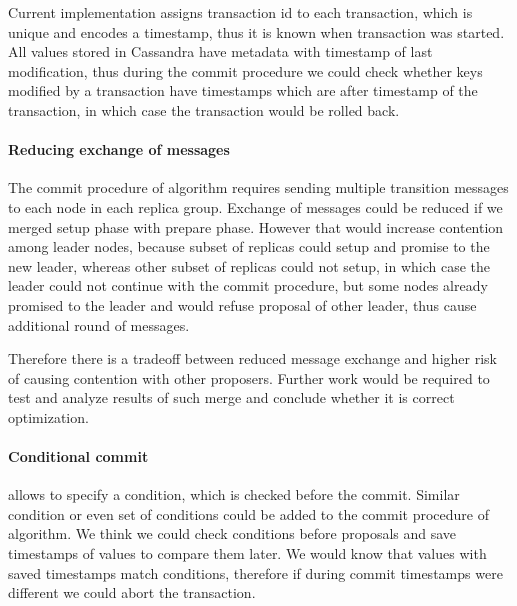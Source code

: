 Current implementation assigns transaction id to each transaction, which is unique and encodes a timestamp, thus it is known when transaction was started. All values stored in Cassandra have metadata with timestamp of last modification, thus during the commit procedure we could check whether keys modified by a transaction have timestamps which are after timestamp of the transaction, in which case the transaction would be rolled back.

\paragraph{Reducing exchange of messages}
The commit procedure of \mpt algorithm requires sending multiple transition messages to each node in each replica group. Exchange of messages could be reduced if we merged setup phase with prepare phase. However that would increase contention among leader nodes, because subset of replicas could setup and promise to the new leader, whereas other subset of replicas could not setup, in which case the leader could not continue with the commit procedure, but some nodes already promised to the leader and would refuse proposal of other leader, thus cause additional round of messages. 

Therefore there is a tradeoff between reduced message exchange and higher risk of causing contention with other proposers. Further work would be required to test and analyze results of such merge and conclude whether it is correct optimization.


\paragraph{Conditional commit}
\lwt allows to specify a condition, which is checked before the commit. Similar condition or even set of conditions could be added to the commit procedure of \mpt algorithm. We think we could check conditions before proposals and save timestamps of values to compare them later. We would know that values with saved timestamps match conditions, therefore if during commit timestamps were different we could abort the transaction.

